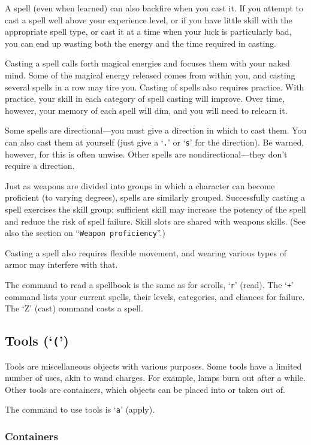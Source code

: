 A spell (even when learned) can also backfire when you cast it.  If you
attempt to cast a spell well above your experience level, or if you have
little skill with the appropriate spell type, or cast it at
a time when your luck is particularly bad, you can end up wasting both the
energy and the time required in casting.

Casting a spell calls forth magical energies and focuses them with
your naked mind.  Some of the magical energy released comes from within
you, and casting several spells in a row may tire you.
Casting of spells also requires practice.  With practice, your
skill in each category of spell casting will improve.  Over time, however,
your memory of each spell will dim, and you will need to relearn it.

Some spells are
directional---you must give a direction in which to cast them.  You can also
cast them at yourself (just give a `{\tt .}' or `{\tt s}' for the direction).
Be warned,
however, for this is often unwise.  Other spells are nondirectional---they
don't require a direction.

Just as weapons are divided into groups in which a character can become
proficient (to varying degrees), spells are similarly grouped.
Successfully casting a spell exercises the skill group; sufficient skill
may increase the potency of the spell and reduce the risk of spell failure.
Skill slots are shared with weapons skills.  (See also the section on
``{\tt Weapon proficiency}''.)

Casting a spell also requires flexible movement, and wearing various types
of armor may interfere with that.

The command to read a spellbook is the same as for scrolls, `{\tt r}'
(read).  The `{\tt +}' command lists your current spells, their levels,
categories, and chances for failure.  
The `Z' (cast) command casts a spell.
\subsection*{Tools (`{\tt (}')}

Tools are miscellaneous objects with various purposes.  Some tools
have a limited number of uses, akin to wand charges.  For example, lamps burn
out after a while.  Other tools are containers, which objects can
be placed into or taken out of.

The command to use tools is `{\tt a}' (apply).
\subsubsection*{Containers}

